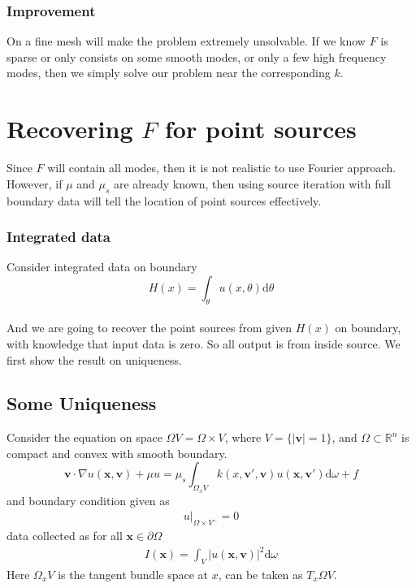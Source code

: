 \documentclass[12pt,a4paper]{article}
\begin{document}
\subsubsection{Improvement}
On a fine mesh will make the problem extremely unsolvable. If we know $F$ is sparse or only consists on some smooth modes, or only a few high frequency modes, then we simply solve our problem near the corresponding $k$.
\section{Recovering $F$ for point sources}
Since $F$ will contain all modes, then it is not realistic to use Fourier approach. However, if $\mu$ and $\mu_s$ are already known, then using source iteration with full boundary data will tell the location of point sources effectively.
\subsubsection{Integrated data}
Consider integrated data on boundary $$H(x) = \int_{\theta} u(x,\theta) \mathrm{d}\theta$$\\
And we are going to recover the point sources from given $H(x)$ on boundary, with knowledge that input data is zero. So all output is from inside source. We first show the result on uniqueness.
\subsection{Some Uniqueness}
Consider the equation on space $\Omega V = \Omega \times V$, where $V = \{|\mathbf{v}| = 1\}$, and $\Omega\subset \mathbb{R}^n$ is compact and convex with smooth boundary.
\begin{equation}
\mathbf{v}\cdot \nabla u(\mathbf{x},\mathbf{v}) + \mu u = \mu_s \int_{\Omega_xV} k(x,\mathbf{v'},\mathbf{v})u(\mathbf{x},\mathbf{v'})\mathrm{d}\omega + f
\end{equation}
and boundary condition given as
\begin{eqnarray}
u |_{\Omega\times V^{-}} = 0
\end{eqnarray}
data collected as for all $\mathbf{x}\in \partial \Omega$
\begin{eqnarray}
I(\mathbf{x}) = \int_{V} |u (\mathbf{x},\mathbf{v})|^2\mathrm{d}\omega 
\end{eqnarray}
Here $\Omega_xV$ is the tangent bundle space at $x$, can be taken as $T_x\Omega V$.
\end{document}
